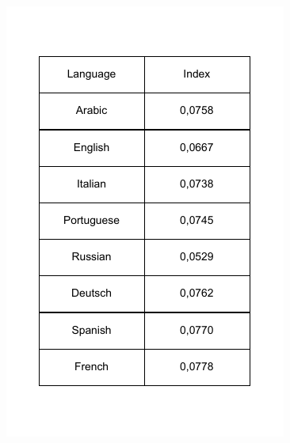 \vspace{0.5cm}
\begin{center} 
    \includegraphics[height=0.4\textheight]{Chapters/Diagram/Crypto/index.drawio.pdf}
\end{center}

\newpage

